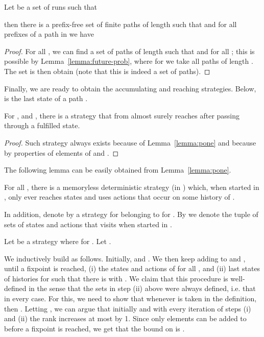 \documentclass[a4paper,UKenglish]{lipics}
\begin{document}
\begin{lemma}\label{lemma:still-in-set}
	Let  be a set of runs such that
	
	then there is a prefix-free set  of finite paths of length
	 such that 
	and for all prefixes  of a path in 
	we have
	
\end{lemma}
\begin{proof}
	For all , we can find a set
	 of paths of length  such that  and
	 for all ; this is possible by
	Lemma~\ref{lemma:future-prob}, where for  we take all paths
	of length . The set  is then
	obtain  (note that this is indeed a set of paths).
\end{proof}

Finally, we are ready to obtain the accumulating and reaching strategies. Below,  is the last state of a path .

\begin{lemma}
	For ,  and , there is a strategy 
	that from  almost surely reaches  after passing through a fulfilled state.
\end{lemma}
\begin{proof}
	Such strategy always exists because of Lemma~\ref{lemma:pone} and because
	 by properties of elements of  and .
\end{proof}

The following lemma can be easily obtained from Lemma~\ref{lemma:pone}.
\begin{lemma}
	For all , there is a memoryless deterministic strategy  (in ) which, when started in , only ever reaches
	states and uses actions that occur on some history of .
\end{lemma}

In addition, denote by 
a strategy  for  belonging to  for .
By  we denote the tuple of sets of states and actions that  visits when started in .

Let  be a strategy  where  for . Let .

We inductively build  as follows. Initially,  and . We then keep adding to  and , until a fixpoint is reached, (i) the states and actions of  for all ,
and (ii) last states of histories  for  such that there is  with .
We claim that this procedure is well-defined in the sense that
the sets  in step (ii) above were always defined, i.e. that  in every case.
For this, we need to show that whenever  is taken in the definition,
then . Letting
, we can argue that initially  and with every iteration of steps (i) and (ii) the rank increases at most by 1.
Since only  elements can be added to  before a fixpoint is reached, we get that the bound on  is .
\end{document}
